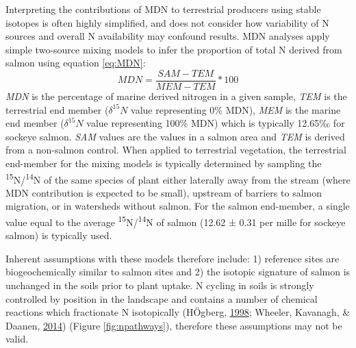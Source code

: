 \documentclass [11pt, proquest] {uwthesis}[2015/03/03]
\begin{document}
Interpreting the contributions of MDN to terrestrial producers using
stable isotopes is often highly simplified, and does not consider how
variability of N sources and overall N availability may confound
results. MDN analyses apply simple two-source mixing models to infer the
proportion of total N derived from salmon using equation \eqref{eq:MDN}:
\begin{equation} 
  MDN = \frac{SAM-TEM}{MEM-TEM}*100
  \label{eq:MDN}
\end{equation}
\emph{MDN} is the percentage of marine derived nitrogen in a given
sample, \emph{TEM} is the terrestrial end member (\(\delta^{15}N\) value
representing 0\% MDN), \emph{MEM} is the marine end member
(\(\delta^{15}N\) value representing 100\% MDN) which is typically
12.65‰ for sockeye salmon. \emph{SAM} values are the values in a salmon
area and \emph{TEM} is derived from a non-salmon control. When applied
to terrestrial vegetation, the terrestrial end-member for the mixing
models is typically determined by sampling the
\textsuperscript{15}N/\textsuperscript{14}N of the same species of plant
either laterally away from the stream (where MDN contribution is
expected to be small), upstream of barriers to salmon migration, or in
watersheds without salmon. For the salmon end-member, a single value
equal to the average \textsuperscript{15}N/\textsuperscript{14}N of
salmon (12.62 ± 0.31 per mille for sockeye salmon) is typically used.

Inherent assumptions with these models therefore include: 1) reference
sites are biogeochemically similar to salmon sites and 2) the isotopic
signature of salmon is unchanged in the soils prior to plant uptake. N
cycling in soils is strongly controlled by position in the landscape and
contains a number of chemical reactions which fractionate N isotopically
(HÖgberg, \protect\hyperlink{ref-Hogberg1998}{1998}; Wheeler, Kavanagh,
\& Daanen, \protect\hyperlink{ref-Wheeler2014}{2014}) (Figure
\ref{fig:npathways}), therefore these assumptions may not be valid.
\end{document}
